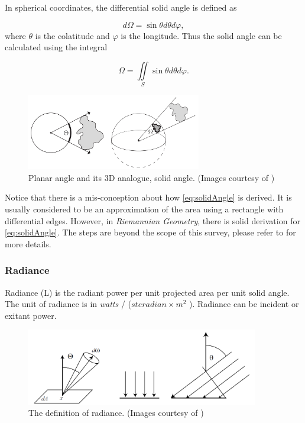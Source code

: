\documentclass[]{book}
\begin{document}
In spherical coordinates, the differential solid angle is defined as

\begin{equation}
	\label{eq:solidAngle}
	d\Omega = \sin \theta d\theta d \varphi,
\end{equation}
where $\theta$ is the colatitude and $\varphi$ is the longitude.
Thus the solid angle can be calculated using the integral

\begin{equation}
	\Omega = \iint\limits_S \sin \theta d \theta d \varphi .
\end{equation}

\begin{figure}
	\centering
	\includegraphics[width=3.0in]{img/GI-solidAngle.png}
	\caption[Solid angle]{Planar angle and its 3D analogue, solid angle. (Images courtesy of \citeauthor{PBRT3e})}
	\label{fig:GI:solidAngle}
\end{figure}

Notice that there is a mis-conception about how \eqref{eq:solidAngle} is derived.
It is usually considered to be an approximation of the area using a rectangle with differential edges.
However, in \textit{Riemannian Geometry}, there is solid derivation for \eqref{eq:solidAngle}.
The steps are beyond the scope of this survey, please refer to \cite{solidAngleDerivation} for more details.

\subsubsection*{Radiance}
Radiance (L) is the radiant power per unit projected area per unit solid angle.
The unit of radiance is in \textit{watts} / ($steradian \times m^2$ ).
Radiance can be incident or exitant power.

\begin{figure}
	\centering
	\includegraphics[width=4.0in]{img/GI-radiance.png}
	\caption[Definition of radiance]{The definition of radiance. (Images courtesy of \citeauthor{AdvancedGI})}
	\label{fig:GI:radiance}
\end{figure}
\end{document}
